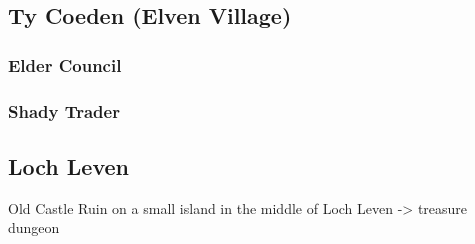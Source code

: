 \subsection*{Ty Coeden (Elven Village)}
\subsubsection*{Elder Council}
\subsubsection*{Shady Trader}
\subsection*{Loch Leven}
Old Castle Ruin on a small island in the middle of Loch Leven -> treasure dungeon
